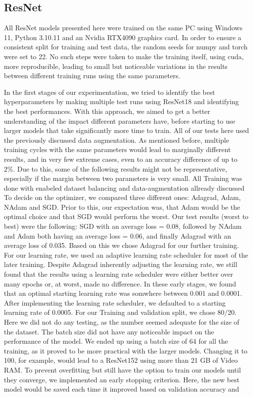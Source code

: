 \subsection{ResNet}\label{resultsReNet}

\label{setup}
All ResNet models presented here were trained on the same PC using Windows 11, Python 3.10.11 and an Nvidia RTX4090 graphics card. In order to ensure a consistent split for training and test data, the random seeds for numpy and torch were set to 22. No such steps were taken to make the training itself, using cuda, more reproducible, leading to small but noticeable variations in the results between different training runs using the same parameters.

\label{Hyperparameters}
In the first stages of our experimentation, we tried to identify the best hyperparameters by making multiple test runs using ResNet18 and identifying the best performances. With this approach, we aimed to get a better understanding of the impact different parameters have, before starting to use larger models that take significantly more time to train. All of our tests here used the previously discussed data augmentation. As mentioned before, multiple training cycles with the same parameters would lead to marginally different results, and in very few extreme cases, even to an accuracy difference of up to 2\%. Due to this, some of the following results might not be representative, especially if the margin between two parameters is very small. All Training was done with enabeled dataset balancing and data-augmentation allready discussed To decide on the optimizer, we compared three different ones: Adagrad, Adam, NAdam and SGD. Prior to this, our expectation was, that Adam would be the optimal choice and that SGD would perform the worst. Our test results (worst to best) were the following: SGD with an average loss = 0.08, followed by NAdam and Adam both having an average loss = 0.06, and finally Adagrad with an average loss of 0.035. Based on this we chose Adagrad for our further training. For our learning rate, we used an adaptive learning rate scheduler for most of the later training. Despite Adagrad inherently adjusting the learning rate, we still found that the results using a learning rate scheduler were either better over many epochs or, at worst, made no difference. In these early stages, we found that an optimal starting learning rate was somwhere between 0.001 and 0.0001. After implementing the learning rate scheduler, we defaulted to a starting learning rate of 0.0005. For our Training and validation split, we chose 80/20. Here we did not do any testing, as the number seemed adequate for the size of the dataset. The batch size did not have any noticeable impact on the performance of the model. We ended up using a batch size of 64 for all the training, as it proved to be more practical with the larger models. Changing it to 100, for example, would lead to a ResNet152 using more than 21 GB of Video RAM. To prevent overfitting but still have the option to train our models until they converge, we implemented an early stopping criterion. Here, the new best model would be saved each time it improved based on validation accuracy and 